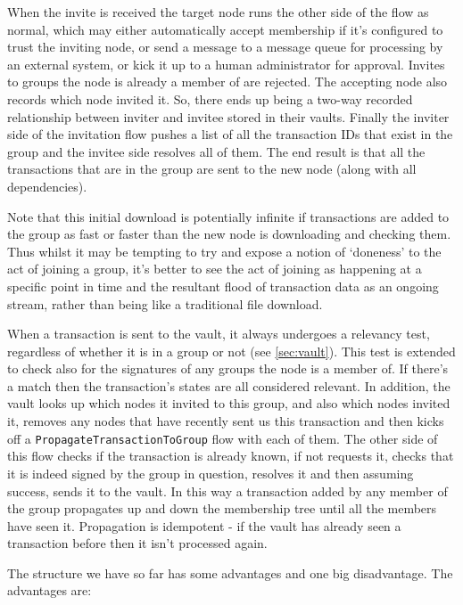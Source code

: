 \documentclass{article}
\begin{document}
When the invite is received the target node runs the other side of the flow as normal, which may either automatically
accept membership if it's configured to trust the inviting node, or send a message to a message queue for processing by an
external system, or kick it up to a human administrator for approval. Invites to groups the node is already a
member of are rejected. The accepting node also records which node invited it. So, there ends up being a two-way
recorded relationship between inviter and invitee stored in their vaults. Finally the inviter side of the
invitation flow pushes a list of all the transaction IDs that exist in the group and the invitee side resolves all of
them. The end result is that all the transactions that are in the group are sent to the new node (along with all
dependencies).

Note that this initial download is potentially infinite if transactions are added to the group as fast or faster than the
new node is downloading and checking them. Thus whilst it may be tempting to try and expose a notion of `doneness' to
the act of joining a group, it's better to see the act of joining as happening at a specific point in time and the
resultant flood of transaction data as an ongoing stream, rather than being like a traditional file download.

When a transaction is sent to the vault, it always undergoes a relevancy test, regardless of whether it is in a group
or not (see \cref{sec:vault}). This test is extended to check also for the
signatures of any groups the node is a member of. If there's a match then the transaction's states are all considered
relevant. In addition, the vault looks up which nodes it invited to this group, and also which nodes invited it, removes
any nodes that have recently sent us this transaction and then kicks off a \texttt{PropagateTransactionToGroup} flow
with each of them.  The other side of this flow checks if the transaction is already known, if not requests it, checks
that it is indeed signed by the group in question, resolves it and then assuming success, sends it to the vault. In this
way a transaction added by any member of the group propagates up and down the membership tree until all the members have
seen it. Propagation is idempotent - if the vault has already seen a transaction before then it isn't processed again.

The structure we have so far has some advantages and one big disadvantage. The advantages are:
\end{document}
